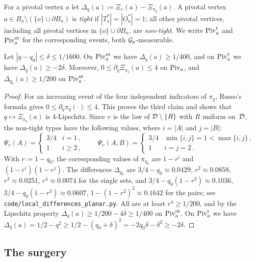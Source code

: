 \documentclass[11pt,letterpaper]{article}
\begin{document}
For a pivotal vertex $a$ let $\Delta_q(a)\coloneqq\Xi_\upsilon(a)-\Xi_{\pi_q}(a)$. A pivotal vertex $a\in B_n\setminus(\{o\}\cup\partial B_n)$ is \emph{tight} if $|T_a^*|=|O_a^*|=1$; all other pivotal vertices, including all pivotal vertices in $\{o\}\cup\partial B_n$, are \emph{non-tight}. We write $\mathrm{Piv}_a^{\mathrm t}$ and $\mathrm{Piv}_a^{\mathrm{nt}}$ for the corresponding events, both $\mathcal G_a$-measurable.

\begin{lemma}\label{lem:differences}
Let $|q-q_0|\le\delta\le1/1600$. On $\mathrm{Piv}_a^{\mathrm{nt}}$ we have $\Delta_q(a)\ge1/400$, and on $\mathrm{Piv}_a^{\mathrm t}$ we have $\Delta_q(a)\ge-2\delta$. Moreover, $0\le\partial_q\Xi_{\pi_q}(a)\le4$ on $\mathrm{Piv}_a$, and $\Delta_{q_0}(a)\ge1/200$ on $\mathrm{Piv}_a^{\mathrm{nt}}$.
\end{lemma}

\begin{proof}
For an increasing event of the four independent indicators of $\pi_q$, Russo's formula gives $0\le\partial_q\pi_q(\cdot)\le4$. This proves the third claim and shows that $q\mapsto\Xi_{\pi_q}(a)$ is $4$-Lipschitz. Since $\upsilon$ is the law of $\mathcal D\setminus\{R\}$ with $R$ uniform on~$\mathcal D$, the non-tight types have the following values, where $i=|A|$ and $j=|B|$:
\begin{equation*}
\Psi_\upsilon(A)=\begin{cases}3/4&i=1\,,\\1&i\ge2\,,\end{cases}\qquad\Psi_\upsilon(A,B)=\begin{cases}3/4&\min\{i,j\}=1<\max\{i,j\}\,,\\1&i=j=2\,.\end{cases}
\end{equation*}
With $r\coloneqq1-q_0$, the corresponding values of $\pi_{q_0}$ are $1-r^i$ and $(1-r^i)(1-r^j)$. The differences $\Delta_{q_0}$ are $3/4-q_0\approx0.0429$, $r^2\approx0.0858$, $r^3\approx0.0251$, $r^4\approx0.0074$ for the single sets, and $3/4-q_0(1-r^2)\approx0.1036$, $3/4-q_0(1-r^3)\approx0.0607$, $1-(1-r^2)^2\approx0.1642$ for the pairs; see \texttt{code/local\_differences\_planar.py}. All are at least $r^4\ge1/200$, and by the Lipschitz property $\Delta_q(a)\ge1/200-4\delta\ge1/400$ on $\mathrm{Piv}^{\mathrm{nt}}_a$. On $\mathrm{Piv}_a^{\mathrm t}$ we have $\Delta_q(a)=1/2-q^2\ge1/2-(q_0+\delta)^2=-2q_0\delta-\delta^2\ge-2\delta$.
\end{proof}

\subsection{The surgery}
\end{document}
